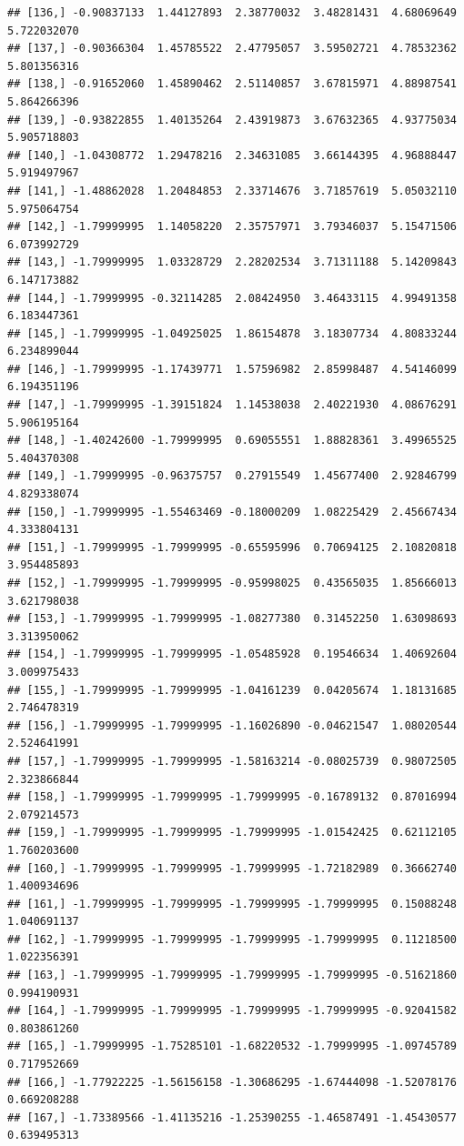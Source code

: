 \documentclass{article}\usepackage[]{graphicx}\usepackage[]{color}
\makeatletter
\newenvironment{kframe}{%
 \def\at@end@of@kframe{}%
 \ifinner\ifhmode%
  \def\at@end@of@kframe{\end{minipage}}%
  \begin{minipage}{\columnwidth}%
 \fi\fi%
 \def\FrameCommand##1{\hskip\@totalleftmargin \hskip-\fboxsep
 \colorbox{shadecolor}{##1}\hskip-\fboxsep
     \hskip-\linewidth \hskip-\@totalleftmargin \hskip\columnwidth}%
 \MakeFramed {\advance\hsize-\width
   \@totalleftmargin\z@ \linewidth\hsize
   \@setminipage}}%
 {\par\unskip\endMakeFramed%
 \at@end@of@kframe}
\newenvironment{knitrout}{}{} %
\makeatother
\begin{document}
\begin{knitrout}
\begin{kframe}
\begin{verbatim}
## [136,] -0.90837133  1.44127893  2.38770032  3.48281431  4.68069649  5.722032070
## [137,] -0.90366304  1.45785522  2.47795057  3.59502721  4.78532362  5.801356316
## [138,] -0.91652060  1.45890462  2.51140857  3.67815971  4.88987541  5.864266396
## [139,] -0.93822855  1.40135264  2.43919873  3.67632365  4.93775034  5.905718803
## [140,] -1.04308772  1.29478216  2.34631085  3.66144395  4.96888447  5.919497967
## [141,] -1.48862028  1.20484853  2.33714676  3.71857619  5.05032110  5.975064754
## [142,] -1.79999995  1.14058220  2.35757971  3.79346037  5.15471506  6.073992729
## [143,] -1.79999995  1.03328729  2.28202534  3.71311188  5.14209843  6.147173882
## [144,] -1.79999995 -0.32114285  2.08424950  3.46433115  4.99491358  6.183447361
## [145,] -1.79999995 -1.04925025  1.86154878  3.18307734  4.80833244  6.234899044
## [146,] -1.79999995 -1.17439771  1.57596982  2.85998487  4.54146099  6.194351196
## [147,] -1.79999995 -1.39151824  1.14538038  2.40221930  4.08676291  5.906195164
## [148,] -1.40242600 -1.79999995  0.69055551  1.88828361  3.49965525  5.404370308
## [149,] -1.79999995 -0.96375757  0.27915549  1.45677400  2.92846799  4.829338074
## [150,] -1.79999995 -1.55463469 -0.18000209  1.08225429  2.45667434  4.333804131
## [151,] -1.79999995 -1.79999995 -0.65595996  0.70694125  2.10820818  3.954485893
## [152,] -1.79999995 -1.79999995 -0.95998025  0.43565035  1.85666013  3.621798038
## [153,] -1.79999995 -1.79999995 -1.08277380  0.31452250  1.63098693  3.313950062
## [154,] -1.79999995 -1.79999995 -1.05485928  0.19546634  1.40692604  3.009975433
## [155,] -1.79999995 -1.79999995 -1.04161239  0.04205674  1.18131685  2.746478319
## [156,] -1.79999995 -1.79999995 -1.16026890 -0.04621547  1.08020544  2.524641991
## [157,] -1.79999995 -1.79999995 -1.58163214 -0.08025739  0.98072505  2.323866844
## [158,] -1.79999995 -1.79999995 -1.79999995 -0.16789132  0.87016994  2.079214573
## [159,] -1.79999995 -1.79999995 -1.79999995 -1.01542425  0.62112105  1.760203600
## [160,] -1.79999995 -1.79999995 -1.79999995 -1.72182989  0.36662740  1.400934696
## [161,] -1.79999995 -1.79999995 -1.79999995 -1.79999995  0.15088248  1.040691137
## [162,] -1.79999995 -1.79999995 -1.79999995 -1.79999995  0.11218500  1.022356391
## [163,] -1.79999995 -1.79999995 -1.79999995 -1.79999995 -0.51621860  0.994190931
## [164,] -1.79999995 -1.79999995 -1.79999995 -1.79999995 -0.92041582  0.803861260
## [165,] -1.79999995 -1.75285101 -1.68220532 -1.79999995 -1.09745789  0.717952669
## [166,] -1.77922225 -1.56156158 -1.30686295 -1.67444098 -1.52078176  0.669208288
## [167,] -1.73389566 -1.41135216 -1.25390255 -1.46587491 -1.45430577  0.639495313

\end{verbatim}
\end{kframe}
\end{knitrout}
\end{document}
